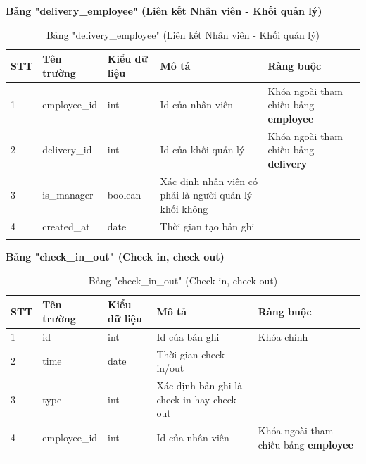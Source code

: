 \documentclass[../DoAn.tex]{subfiles}
\begin{document}
\textbf{Bảng "delivery\_employee" (Liên kết Nhân viên - Khối quản lý)}
\begin{longtable}{|p{}|p{}|p{}|p{}|p{}|}
\hline
\textbf{STT} & \textbf{Tên trường} & \textbf{Kiểu dữ liệu} & \textbf{Mô tả } & \textbf{Ràng buộc} \\ \hline
1   & employee\_id & int & Id của nhân viên & Khóa ngoài tham chiếu bảng \textbf{employee} \\ \hline
2   & delivery\_id & int & Id của khối quản lý & Khóa ngoài tham chiếu bảng \textbf{delivery} \\ \hline
3   & is\_manager & boolean & Xác định nhân viên có phải là người quản lý khối không & \\ \hline
4   & created\_at & date & Thời gian tạo bản ghi & \\ \hline
\caption{Bảng "delivery\_employee" (Liên kết Nhân viên - Khối quản lý)}
\end{longtable}

\textbf{Bảng "check\_in\_out" (Check in, check out)}
\begin{longtable}{|p{}|p{}|p{}|p{}|p{}|}
\hline
\textbf{STT} & \textbf{Tên trường} & \textbf{Kiểu dữ liệu} & \textbf{Mô tả } & \textbf{Ràng buộc} \\ \hline
1   & id & int & Id của bản ghi & Khóa chính \\ \hline
2   & time & date & Thời gian check in/out & \\ \hline
3   & type & int & Xác định bản ghi là check in hay check out & \\ \hline
4   & employee\_id & int & Id của nhân viên & Khóa ngoài tham chiếu bảng \textbf{employee} \\ \hline
\caption{Bảng "check\_in\_out" (Check in, check out)}
\end{longtable}
\end{document}
